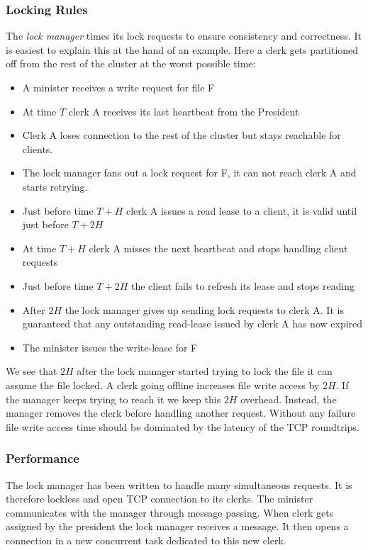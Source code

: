 \subsubsection*{Locking Rules}
The \textit{lock manager} times its lock requests to ensure consistency and correctness. It is easiest to explain this at the hand of an example. Here a clerk gets partitioned off from the rest of the cluster at the worst possible time:
%
\begin{itemize}
	\item A minister receives a write request for file F
	\item At time $T$ clerk A receives its last heartbeat from the President
	\item Clerk A loses connection to the rest of the cluster but stays reachable for clients.
	\item The lock manager fans out a lock request for F, it can not reach clerk A and starts retrying.
	\item Just before time $T+H$ clerk A issues a read lease to a client, it is valid until just before $T+2H$
	\item At time $T+H$ clerk A misses the next heartbeat and stops handling client requests
	\item Just before time $T+2H$ the client fails to refresh its lease and stops reading
	\item After $2H$ the lock manager gives up sending lock requests to clerk A. It is guaranteed that any outstanding read-lease issued by clerk A has now expired
	\item The minister issues the write-lease for F
\end{itemize}
%
We see that $2H$ after the lock manager started trying to lock the file it can assume the file locked. A clerk going offline increases file write access by $2H$. If the manager keeps trying to reach it we keep this $2H$ overhead. Instead, the manager removes the clerk before handling another request. Without any failure file write access time should be dominated by the latency of the TCP roundtrips.
%
\subsubsection*{Performance}
The lock manager has been written to handle many simultaneous requests. It is therefore lockless and open TCP connection to its clerks. The minister communicates with the manager through message passing. When clerk gets assigned by the president the lock manager receives a message. It then opens a connection in a new concurrent task dedicated to this new clerk. 

